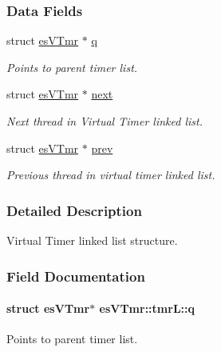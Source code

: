 \subsubsection*{Data Fields}
\begin{DoxyCompactItemize}
\item 
struct \hyperlink{structesVTmr}{es\-V\-Tmr} $\ast$ \hyperlink{structesVTmr_1_1tmrL_a560f95e9c3b04c4a6da678fd4a633d79}{q}
\begin{DoxyCompactList}\small\item\em Points to parent timer list. \end{DoxyCompactList}\item 
struct \hyperlink{structesVTmr}{es\-V\-Tmr} $\ast$ \hyperlink{structesVTmr_1_1tmrL_a5395eb5d6e77ea662b0f6e5cae542f64}{next}
\begin{DoxyCompactList}\small\item\em Next thread in Virtual Timer linked list. \end{DoxyCompactList}\item 
struct \hyperlink{structesVTmr}{es\-V\-Tmr} $\ast$ \hyperlink{structesVTmr_1_1tmrL_aa5afd2bcc0767e15743ec611b9f9dfd1}{prev}
\begin{DoxyCompactList}\small\item\em Previous thread in virtual timer linked list. \end{DoxyCompactList}\end{DoxyCompactItemize}


\subsubsection{Detailed Description}
Virtual Timer linked list structure. 

\subsubsection{Field Documentation}
\hypertarget{structesVTmr_1_1tmrL_a560f95e9c3b04c4a6da678fd4a633d79}{
\paragraph[{q}]{\setlength{\rightskip}{0pt plus 5cm}struct {\bf es\-V\-Tmr}$\ast$ es\-V\-Tmr\-::tmr\-L\-::q}}\label{structesVTmr_1_1tmrL_a560f95e9c3b04c4a6da678fd4a633d79}


Points to parent timer list. 

